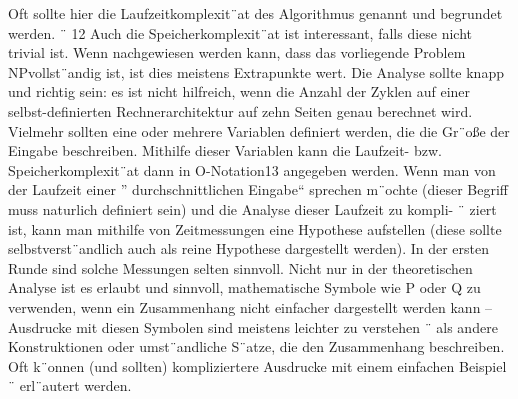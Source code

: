 \documentclass[a4paper,10pt,ngerman]{scrartcl}
\begin{document}
    Oft sollte hier die Laufzeitkomplexit¨at des Algorithmus genannt und begrundet werden.
    ¨ 12 Auch die Speicherkomplexit¨at ist interessant, falls diese nicht trivial ist.
    Wenn nachgewiesen werden kann, dass das vorliegende Problem NPvollst¨andig ist, ist dies meistens Extrapunkte wert.
    Die Analyse sollte knapp und richtig
    sein: es ist nicht hilfreich, wenn die Anzahl der Zyklen auf einer selbst-definierten Rechnerarchitektur auf zehn Seiten genau berechnet wird.
    Vielmehr sollten eine oder mehrere
    Variablen definiert werden, die die Gr¨oße der Eingabe beschreiben.
    Mithilfe dieser Variablen kann die Laufzeit- bzw.
    Speicherkomplexit¨at dann in O-Notation13 angegeben
    werden.
    Wenn man von der Laufzeit einer ”
    durchschnittlichen Eingabe“ sprechen m¨ochte
    (dieser Begriff muss naturlich definiert sein) und die Analyse dieser Laufzeit zu kompli- ¨
    ziert ist, kann man mithilfe von Zeitmessungen eine Hypothese aufstellen (diese sollte
    selbstverst¨andlich auch als reine Hypothese dargestellt werden).
    In der ersten Runde sind solche Messungen selten sinnvoll.
    Nicht nur in der theoretischen Analyse ist es erlaubt und sinnvoll, mathematische
    Symbole wie P oder Q
    zu verwenden, wenn ein Zusammenhang nicht einfacher dargestellt werden kann – Ausdrucke mit diesen Symbolen sind meistens leichter zu verstehen ¨
    als andere Konstruktionen oder umst¨andliche S¨atze, die den Zusammenhang beschreiben.
    Oft k¨onnen (und sollten) kompliziertere Ausdrucke mit einem einfachen Beispiel ¨
    erl¨autert werden.
\end{document}
